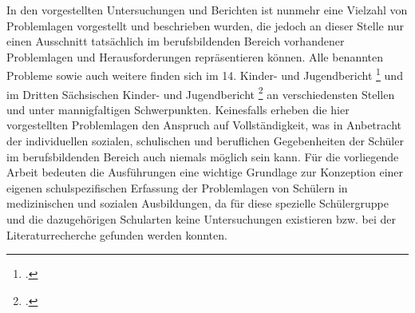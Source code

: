 In den vorgestellten Untersuchungen und Berichten ist nunmehr eine Vielzahl von Problemlagen vorgestellt und beschrieben wurden, die jedoch an dieser Stelle nur einen Ausschnitt tatsächlich im berufsbildenden Bereich vorhandener Problemlagen und Herausforderungen repräsentieren können. Alle benannten Probleme sowie auch weitere finden sich im 14. Kinder- und Jugendbericht \footcite[44f]{BundesministeriumFamilie2013} und im Dritten Sächsischen Kinder- und Jugendbericht \footcite[30ff]{SMSSS2009} an verschiedensten Stellen und unter mannigfaltigen Schwerpunkten. Keinesfalls erheben die hier vorgestellten Problemlagen den Anspruch auf Vollständigkeit, was in Anbetracht der individuellen sozialen, schulischen und beruflichen Gegebenheiten der Schüler im berufsbildenden Bereich auch niemals möglich sein kann. Für die vorliegende Arbeit bedeuten die Ausführungen eine wichtige Grundlage zur Konzeption einer eigenen schulspezifischen Erfassung der Problemlagen von Schülern in medizinischen und sozialen Ausbildungen, da für diese spezielle Schülergruppe und die dazugehörigen Schularten keine Untersuchungen existieren bzw. bei der Literaturrecherche gefunden werden konnten.   



